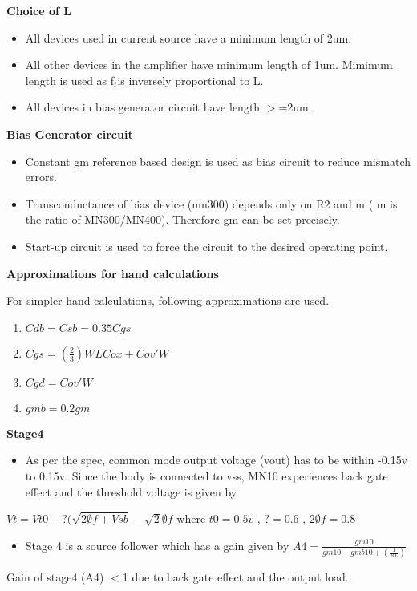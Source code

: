 \documentclass[12pt,a4paper]{article}
\begin{document}
\textbf{Choice of L}

\begin{itemize}
\item All devices used in current source have a minimum length of 2um.
\item All other devices in the amplifier have minimum length of 1um. 
Mimimum length is used as f$_{t }$is inversely proportional to L.
\item All devices in bias generator circuit have length $>$=2um.
\end{itemize}


\textbf{Bias Generator circuit}

\begin{itemize}
\item Constant gm reference based design is used as bias circuit to 
reduce mismatch errors.
\item Transconductance of bias device (mn300) depends only on R2 and m ( 
m is the ratio of MN300/MN400). Therefore gm can be set precisely.
\item Start-up circuit is used to force the circuit to the desired 
operating point.
\end{itemize}


\textbf{Approximations for hand calculations}

For simpler hand calculations, following approximations are used.

\begin{enumerate}
\item $Cdb=Csb=0.35 Cgs$
\item $Cgs=(\frac{2}{3})WLCox+Cov'W$
\item $Cgd=Cov'W$
\item $gmb=0.2gm$
\setcounter{numberedCntBB}{\theenumi}
\end{enumerate}
\textbf{Stage4}

\begin{itemize}
\item As per the spec, common mode output voltage (vout) has to be 
within -0.15v to 0.15v. Since the body is connected to vss, MN10 
experiences back gate effect and the threshold voltage is given by
\end{itemize}
$Vt=Vt0+ ?(\sqrt{2\emptyset f+Vsb}- \sqrt{2}\emptyset f$ where $
t0=0.5v$ , $?=0.6$ , $2\emptyset f=0.8$



\begin{itemize}
\item Stage 4 is a source follower which has a gain given by $
A4=\frac{gm10}{gm10+gmb10+(\frac{1}{RL})}$
\end{itemize}
Gain of stage4 (A4) $<$1 due to back gate effect and the output load. 
\end{document}

